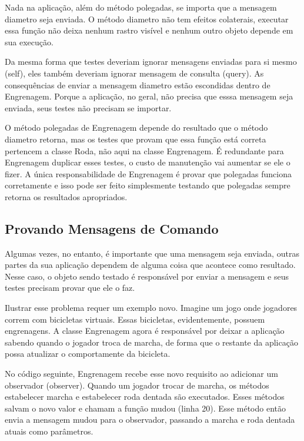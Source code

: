 Nada na aplicação, além do método polegadas, se importa que a mensagem diametro seja enviada. O método diametro não tem efeitos colaterais, executar essa função não deixa nenhum rastro visível e nenhum outro objeto depende em sua execução.

Da mesma forma que testes deveriam ignorar mensagens enviadas para si mesmo (self), eles também deveriam ignorar mensagem de consulta (query). As consequências de enviar a mensagem diametro estão escondidas dentro de Engrenagem. Porque a aplicação, no geral, não precisa que esssa mensagem seja enviada, seus testes não precisam se importar.

O método polegadas de Engrenagem depende do resultado que o método diametro retorna, mas os testes que provam que essa função está correta pertencem a classe Roda, não aqui na classe Engrenagem. É redundante para Engrenagem duplicar esses testes, o custo de manutenção vai aumentar se ele o fizer. A única responsabilidade de Engrenagem é provar que polegadas funciona corretamente e isso pode ser feito simplesmente testando que polegadas sempre retorna os resultados apropriados.

\subsection{ Provando Mensagens de Comando }

Algumas vezes, no entanto, é importante que uma mensagem seja enviada, outras partes da sua aplicação dependem de alguma coisa que acontece como resultado. Nesse caso, o objeto sendo testado é responsável por enviar a mensagem e seus testes precisam provar que ele o faz.

Ilustrar esse problema requer um exemplo novo. Imagine um jogo onde jogadores correm com bicicletas virtuais. Essas bicicletas, evidentemente, possuem engrenagens. A classe Engrenagem agora é responsável por deixar a aplicação sabendo quando o jogador troca de marcha, de forma que o restante da aplicação possa atualizar o comportamente da bicicleta.

No código seguinte, Engrenagem recebe esse novo requisito ao adicionar um observador (observer). Quando um jogador trocar de marcha, os métodos estabelecer marcha e estabelecer roda dentada são executados. Esses métodos salvam o novo valor e chamam a função mudou (linha 20). Esse método então envia a mensagem mudou para o observador, passando a marcha e roda dentada atuais como parâmetros.


